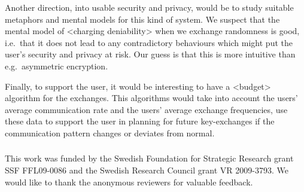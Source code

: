 Another direction, into usable security and privacy, would be to study suitable 
metaphors and mental models for this kind of system.
We suspect that the mental model of <charging deniability> when we exchange 
randomness is good, i.e.~that it does not lead to any contradictory behaviours 
which might put the user's security and privacy at risk.
Our guess is that this is more intuitive than e.g.~asymmetric encryption.

Finally, to support the user, it would be interesting to have a <budget> 
algorithm for the exchanges.
This algorithms would take into account the users' average communication rate 
and the users' average exchange frequencies, use these data to support the user 
in planning for future key-exchanges if the communication pattern changes or 
deviates from normal.


\subsubsection*{\ackname}

This work was funded by the Swedish Foundation for Strategic Research grant SSF 
FFL09-0086 and the Swedish Research Council grant VR 2009-3793.
We would like to thank the anonymous reviewers for valuable feedback.


\printbibliography{}

